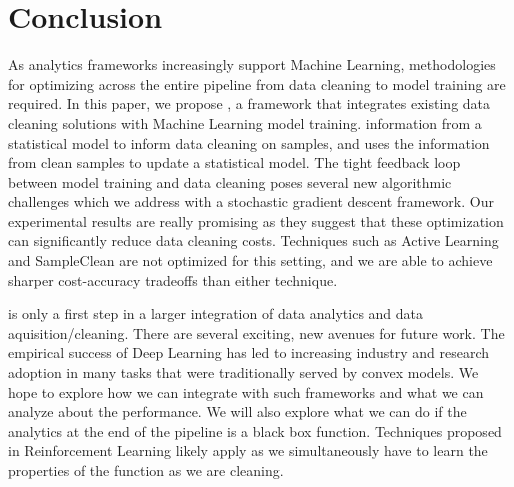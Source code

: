 \section{Conclusion}
As analytics frameworks increasingly support Machine Learning, methodologies for optimizing across the entire pipeline from data cleaning to model training are required.
In this paper, we propose \sysfull, a framework that integrates existing data cleaning solutions with Machine Learning model training.
\sys information from a statistical model to inform data cleaning on samples, and uses the information from clean samples to update a statistical model.
The tight feedback loop between model training and data cleaning poses several new algorithmic challenges which we address with a stochastic gradient descent framework.
Our experimental results are really promising as they suggest that these optimization can significantly reduce data cleaning costs.
Techniques such as Active Learning and SampleClean are not optimized for this setting, and we are able to achieve sharper cost-accuracy tradeoffs than either technique.

\sys is only a first step in a larger integration of data analytics and data aquisition/cleaning. 
There are several exciting, new avenues for future work.
The empirical success of Deep Learning has led to increasing industry and research adoption in many tasks that were traditionally served by convex models.
We hope to explore how we can integrate with such frameworks and what we can analyze about the performance.
We will also explore what we can do if the analytics at the end of the pipeline is a black box function.
Techniques proposed in Reinforcement Learning likely apply as we simultaneously have to learn the properties of the function as we are cleaning.